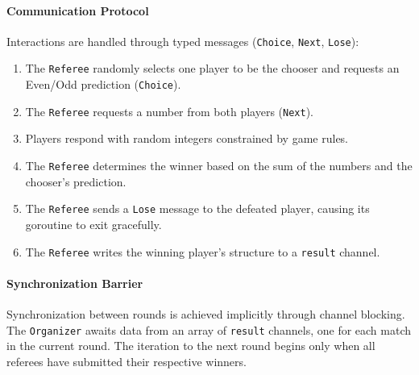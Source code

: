 \documentclass{scrartcl}
\begin{document}
\paragraph{Communication Protocol}
Interactions are handled through typed messages (\texttt{Choice}, \texttt{Next}, \texttt{Lose}):
\begin{enumerate}
    \item The \texttt{Referee} randomly selects one player to be the chooser and requests an Even/Odd prediction (\texttt{Choice}).
    \item The \texttt{Referee} requests a number from both players (\texttt{Next}).
    \item Players respond with random integers constrained by game rules.
    \item The \texttt{Referee} determines the winner based on the sum of the numbers and the chooser's prediction.
    \item The \texttt{Referee} sends a \texttt{Lose} message to the defeated player, causing its goroutine to exit gracefully.
    \item The \texttt{Referee} writes the winning player's structure to a \texttt{result} channel.
\end{enumerate}

\paragraph{Synchronization Barrier}
Synchronization between rounds is achieved implicitly through channel blocking. The \texttt{Organizer} awaits data from an array of \texttt{result} channels, one for each match in the current round. The iteration to the next round begins only when all referees have submitted their respective winners.
\end{document}
